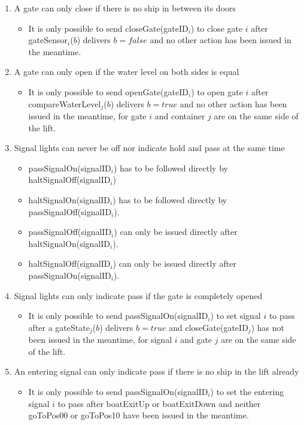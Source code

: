 \begin{enumerate}
	\item A gate can only close if there is no ship in between its doors
	\begin{itemize}
		\item It is only possible to send closeGate(gateID$_i$) to close gate $i$ after gateSensor$_i$($b$) delivers $b = false$ and no other action has been issued in the meantime.
	\end{itemize}
	
	\item A gate can only open if the water level on both sides is equal
	\begin{itemize}
		\item It is only possible to send openGate(gateID$_i$) to open gate $i$ after \linebreak compareWaterLevel$_j$($b$) delivers $b = true$ and no other action has been issued in the meantime, for gate $i$ and container $j$ are on the same side of the lift.
	\end{itemize}
	
	\item Signal lights can never be off nor indicate hold and pass at the same time
		\begin{itemize}
			\item passSignalOn(signalID$_i$) has to be followed directly by haltSignalOff(signalID$_i$)
			\item haltSignalOn(signalID$_i$) has to be followed directly by passSignalOff(signalID$_i$).
			\item passSignalOff(signalID$_i$) can only be issued directly after haltSignalOn(signalID$_i$).
			\item haltSignalOff(signalID$_i$) can only be issued directly after passSignalOn(signalID$_i$).
		\end{itemize}
	\item Signal lights can only indicate pass if the gate is completely opened
		\begin{itemize}
			\item It is only possible to send passSignalOn(signalID$_i$) to set signal $i$ to pass after a gateState$_j$($ b $) delivers $b = true$ and closeGate(gateID$_j$) has not been issued in the meantime, for signal $i$ and gate $j$ are on the same side of the lift.
		\end{itemize}
	\item An entering signal can only indicate pass if there is no ship in the lift already
		\begin{itemize}
			\item It is only possible to send passSignalOn(signalID$_i$) to set the entering signal $i$ to pass after boatExitUp or boatExitDown and neither goToPos00 or goToPos10 have been issued in the meantime.\vspace{0.3cm}
		\end{itemize}
\end{enumerate}


